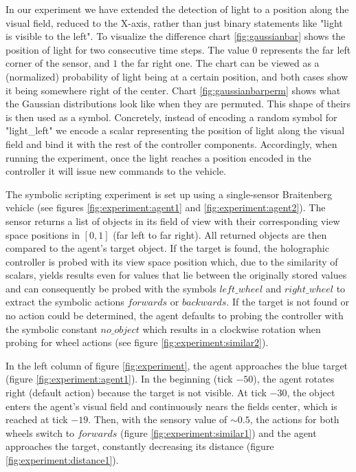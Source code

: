 \documentclass[journal]{journal}
\begin{document}
	In our experiment we have extended the detection of light to a position along the visual field, reduced to the X-axis, rather than just binary statements like "light is visible to the left". To visualize the difference chart \ref{fig:gaussianbar} shows the position of light for two consecutive time steps. The value $0$ represents the far left corner of the sensor, and $1$ the far right one. The chart can be viewed as a (normalized) probability of light being at a certain position, and both cases show it being somewhere right of the center. Chart \ref{fig:gaussianbarperm} shows what the Gaussian distributions look like when they are permuted. This shape of theirs is then used as a symbol. Concretely, instead of encoding a random symbol for "light\_left" we encode a scalar representing the position of light along the visual field and bind it with the rest of the controller components. Accordingly, when running the experiment, once the light reaches a position encoded in the controller it will issue new commands to the vehicle.

The symbolic scripting experiment is set up using a single-sensor Braitenberg
vehicle (see figures \ref{fig:experiment:agent1} and
\ref{fig:experiment:agent2}).
The sensor returns a list of objects in its field of view with their
corresponding view space positions in $[0,1]$ (far left to far right).
All returned objects are then compared to the agent's target object.
If the target is found, the holographic controller is probed with its view space
position which, due to the similarity of scalars, yields results even for
values that lie between the originally stored values and can consequently be
probed with the symbols $left\_wheel$ and $right\_wheel$ to extract the symbolic
actions $forwards$ or $backwards$.
If the target is not found or no action could be determined, the agent defaults
to probing the controller with the symbolic constant $no\_object$ which results in
a clockwise rotation when probing for wheel actions (see figure
\ref{fig:experiment:similar2}).

In the left column of figure \ref{fig:experiment}, the agent approaches the blue
target (figure \ref{fig:experiment:agent1}). In the beginning (tick $-50$), the
agent rotates right (default action) because the target is not visible.
At tick $-30$, the object enters the agent's visual field and continuously nears the fields center, which is reached at tick $-19$.
Then, with the sensory value of ${\sim}0.5$, the actions for both wheels switch
to $forwards$ (figure \ref{fig:experiment:similar1}) and the agent approaches
the target, constantly decreasing its distance
(figure \ref{fig:experiment:distance1}).
\end{document}
